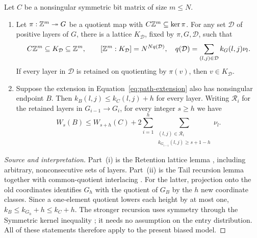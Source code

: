 \begin{lemma}
\label{lem:path-algebra}
Let \(C\) be a nonsingular symmetric bit matrix of size \(m\le N\).
\begin{enumerate}[label=\textnormal{(\roman*)}]
\item Let \(\pi:\mathbb Z^m\twoheadrightarrow G\) be a quotient map with
\(C\mathbb Z^m\subseteq\ker\pi\). For any set \(\mathcal D\) of positive
layers of \(G\), there is a lattice \(K_{\mathcal D}\), fixed by
\(\pi,G,\mathcal D\), such that
\begin{equation}\label{eq:path-retention-lattice}
 C\mathbb Z^m\subseteq K_{\mathcal D}\subseteq\mathbb Z^m,
 \qquad [\mathbb Z^m:K_{\mathcal D}]=N^{Nq(\mathcal D)},
 \quad q(\mathcal D)=\sum_{(l,j)\in\mathcal D}k_G(l,j)\nu_l.
\end{equation}
If every layer in \(\mathcal D\) is retained on quotienting by
\(\pi(v)\), then \(v\in K_{\mathcal D}\).
\item Suppose the extension in Equation~\eqref{eq:path-extension}
also has nonsingular endpoint \(B\). Then
\(k_B(l,j)\le k_C(l,j)+h\) for every layer. Writing
\(\mathcal R_i\) for the retained layers in \(G_{i-1}\to G_i\),
for every integer \(s\ge h\) we have
\begin{equation}\label{eq:path-tail-recursion}
 W_s(B)\le W_{s+h}(C)
   +2\sum_{i=1}^h
       \sum_{\substack{(l,j)\in\mathcal R_i\\
                        k_{G_{i-1}}(l,j)\ge s+1-h}}\nu_l.
\end{equation}
\end{enumerate}
\end{lemma}

\begin{proof}[Source and interpretation]
Part~\textnormal{(i)} is the Retention lattice lemma
\cite[Lemma 7.4]{SymmetricRate}, including arbitrary, nonconsecutive
sets of layers. Part~\textnormal{(ii)} is the Tail recursion lemma
\cite[Lemma 11.1]{SymmetricRate} together with common-quotient
interlacing \cite[Equation (7.11)]{SymmetricRate}. For the latter,
projection onto the old coordinates identifies \(G_h\) with the
quotient of \(G_B\) by the \(h\) new coordinate classes. Since a
one-element quotient lowers each height by at most one,
\(k_B\le k_{G_h}+h\le k_C+h\).
The stronger recursion uses symmetry through the Symmetric kernel
inequality \cite[Lemma 7.5]{SymmetricRate}; it needs no assumption on
the entry distribution. All of these statements therefore apply to
the present biased model.
\end{proof}

